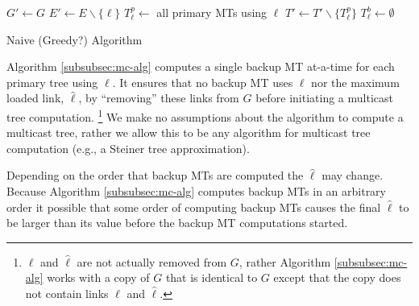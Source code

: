 \begin{algorithm}[T]
\dontprintsemicolon
\BlankLine
{}
$G'\leftarrow G$  \;
$E' \leftarrow E \backslash \{\ell\}$  
$T_\ell^p \leftarrow$ all primary MTs using $\ell$ \;
$T' \leftarrow T' \backslash \{T_\ell^p\}$ \;
$T_{\ell}^b \leftarrow \emptyset $ \;


\caption{Naive (Greedy?) \mf Algorithm}
\label{alg:mf-naive} 
\end{algorithm}

Algorithm \ref{subsubsec:mc-alg} computes a single backup MT at-a-time for each primary tree using $\ell$.  It ensures that no backup MT uses $\ell$ nor the maximum loaded link,
$\hat{\ell}$, by ``removing'' these links from $G$ before initiating a multicast tree computation. 
\footnote{$\ell$ and $\hat{\ell}$ are not actually removed from $G$, rather Algorithm \ref{subsubsec:mc-alg} works with a copy of $G$ that is identical to $G$ except that
the copy does not contain links $\ell$ and $\hat{\ell}$.}
We make no assumptions about the algorithm to compute a multicast tree, rather we allow this to be any algorithm for multicast tree computation (e.g., a Steiner tree approximation).

 
Depending on the order that backup MTs are computed the $\hat{\ell}$ may change.  Because Algorithm \ref{subsubsec:mc-alg} computes backup MTs in an arbitrary order it possible that 
some order of computing backup MTs causes the final $\hat{\ell}$ to be larger than its value before the backup MT computations started. 




